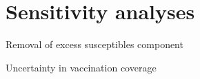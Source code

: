 \appendix

\section{Sensitivity analyses}

Removal of excess susceptibles component

Uncertainty in vaccination coverage